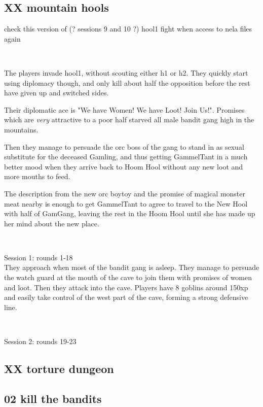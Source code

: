 \subsection*{XX mountain hools}

\todo check this version of (? sessions 9 and 10 ?) hool1 fight when access to nela files again

\

The players invade hool1, without scouting either h1 or h2. They quickly start using diplomacy though, and only kill about half the opposition before the rest have given up and switched sides.

Their diplomatic ace is "We have Women! We have Loot! Join Us!". Promises which are \emph{very} attractive to a poor half starved all male bandit gang high in the mountains.

Then they manage to persuade the orc boss of the gang to stand in as sexual substitute for the deceased Gamling, and thus getting GammelTant in a much better mood when they arrive back to Hoom Hool without any new loot and more mouths to feed.

The description from the new orc boytoy and the promise of magical monster meat nearby is enough to get GammelTant to agree to travel to the New Hool with half of GamGang, leaving the rest in the Hoom Hool until she has made up her mind about the new place.

\

Session 1: rounds 1-18 \\
They approach when most of the bandit gang is asleep. They manage to persuade the watch guard at the mouth of the cave to join them with promises of women and loot. Then they attack into the cave. Players have 8 goblins around 150xp and easily take control of the west part of the cave, forming a strong defensive line.

\

Session 2: rounds 19-23 \\






\subsection*{XX torture dungeon}







\subsection*{02 kill the bandits}

